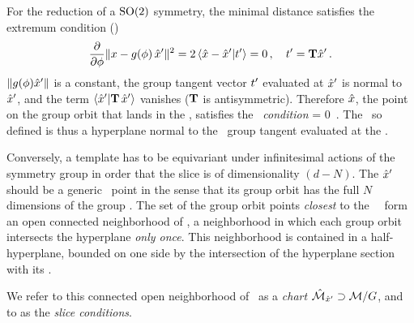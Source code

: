 For the reduction of a $\textrm{SO}(2)$ symmetry, the minimal distance satisfies
the extremum condition ()
\[
\frac{\partial}{\partial \gSpace} \Norm{\ssp - \LieEl(\gSpace)\,\slicep}^2
   =
2\, \braket{\sspRed - \slicep}{\sliceTan{}}
   = 0
        \,,\quad
\sliceTan{} = \Lg \slicep
\,.
\]
$\|{g({\bf \phi}){\hat{x}'}}\|$ is a constant, the group tangent vector
$t'_{}$ evaluated at ${\hat{x}'}$  is normal to
${\hat{x}'}$, and the term $\braket{\slicep}{\Lg \,\slicep}$ vanishes ($\mathbf{T}$
is antisymmetric). Therefore  $\hat{x}$, the point on the group orbit that
lands in the \slice, satisfies the \emph{\slice\ condition}
\beq
\braket{\sspRed}{\sliceTan{}} = 0
    \,.
The \slice\ so defined is thus a hyperplane normal to the \template\
group tangent evaluated at the \template.

Conversely, a template has to be equivariant under infinitesimal actions
of the symmetry group in order that the slice is of dimensionality
$(d-N)$. The {\template} ${\hat{x}'}$
should be a generic \statesp\ point in the sense that its group orbit has
the full $N$ dimensions of the group \Group. The set of the group orbit
points \emph{closest} to the \template\ \slicep\ form an open connected
neighborhood of \slicep, a neighborhood in which each group orbit
intersects the hyperplane \emph{only once}. This neighborhood is
contained in a half-hyperplane, bounded on one side by the intersection
of the hyperplane section with its {\chartBord}.

We refer to this connected open neighborhood
of \slicep\ as a \emph{chart} $\hat{\cal M}_{{\hat{x}'}} \supset {\cal M}/G$,
and
to   as the \emph{slice conditions}.


